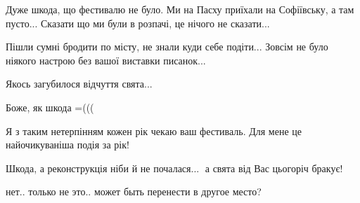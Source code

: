  
 
 
 
 

\qqSecCmt


Дуже шкода, що фестивалю не було. Ми на Пасху приїхали на Софіївську, а там
пусто... Сказати що ми були в розпачі, це нічого не сказати...

Пішли сумні бродити по місту, не знали куди себе подіти... Зовсім не було
ніякого настрою без вашої виставки писанок...

Якось загубилося відчуття свята...


Боже, як шкода =(((

Я з таким нетерпінням кожен рік чекаю ваш фестиваль. Для мене це найочикуваніша
подія за рік!


Шкода, а реконструкція ніби й не почалася...🙁 а свята від Вас цьогоріч бракує!


нет.. только не это.. может быть перенести в другое место?
